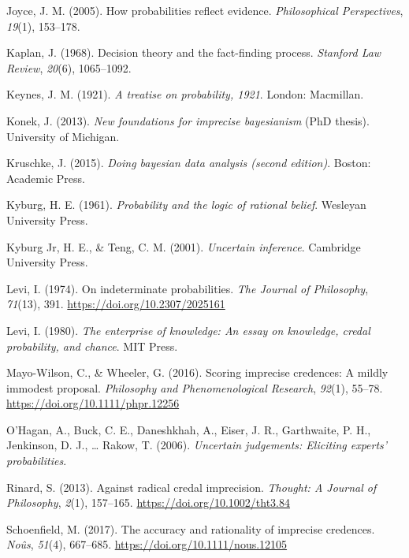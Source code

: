 \documentclass[
  10pt,
  dvipsnames,enabledeprecatedfontcommands]{scrartcl}
\newlength{\cslhangindent}
\newenvironment{CSLReferences}[2] %
 {\begin{list}{}{%
  \setlength{\itemindent}{0pt}
  \setlength{\leftmargin}{0pt}
  \setlength{\parsep}{0pt}
  \ifodd #1
   \setlength{\leftmargin}{\cslhangindent}
   \setlength{\itemindent}{-1\cslhangindent}
  \fi
  \setlength{\itemsep}{#2\baselineskip}}}
 {\end{list}}
\begin{document}
\begin{CSLReferences}{1}{0}
Joyce, J. M. (2005). How probabilities reflect evidence.
\emph{Philosophical Perspectives}, \emph{19}(1), 153--178.

Kaplan, J. (1968). Decision theory and the fact-finding process.
\emph{Stanford Law Review}, \emph{20}(6), 1065--1092.

Keynes, J. M. (1921). \emph{A treatise on probability, 1921}. London:
Macmillan.

Konek, J. (2013). \emph{New foundations for imprecise bayesianism} (PhD
thesis). University of Michigan.

Kruschke, J. (2015). \emph{Doing bayesian data analysis (second
edition)}. Boston: Academic Press.

Kyburg, H. E. (1961). \emph{Probability and the logic of rational
belief}. Wesleyan University Press.

Kyburg Jr, H. E., \& Teng, C. M. (2001). \emph{Uncertain inference}.
Cambridge University Press.

Levi, I. (1974). On indeterminate probabilities. \emph{The Journal of
Philosophy}, \emph{71}(13), 391. \url{https://doi.org/10.2307/2025161}

Levi, I. (1980). \emph{The enterprise of knowledge: An essay on
knowledge, credal probability, and chance}. MIT Press.

Mayo-Wilson, C., \& Wheeler, G. (2016). Scoring imprecise credences: A
mildly immodest proposal. \emph{Philosophy and Phenomenological
Research}, \emph{92}(1), 55--78.
\url{https://doi.org/10.1111/phpr.12256}

O'Hagan, A., Buck, C. E., Daneshkhah, A., Eiser, J. R., Garthwaite, P.
H., Jenkinson, D. J., \ldots{} Rakow, T. (2006). \emph{Uncertain
judgements: Eliciting experts' probabilities}.

Rinard, S. (2013). Against radical credal imprecision. \emph{Thought: A
Journal of Philosophy}, \emph{2}(1), 157--165.
\url{https://doi.org/10.1002/tht3.84}

Schoenfield, M. (2017). The accuracy and rationality of imprecise
credences. \emph{Noûs}, \emph{51}(4), 667--685.
\url{https://doi.org/10.1111/nous.12105}


\end{CSLReferences}
\end{document}

